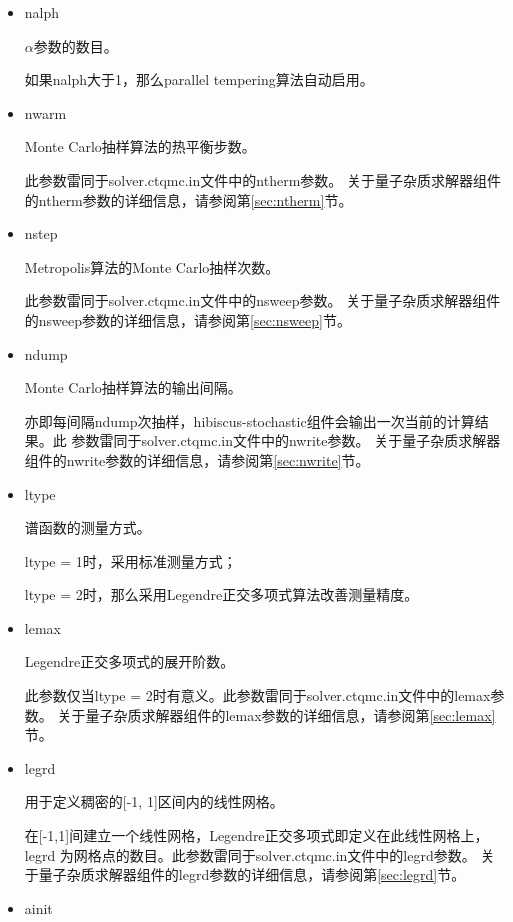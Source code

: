 \begin{itemize}
\item {\color{red}nalph}

$\alpha$参数的数目。

如果nalph大于1，那么parallel tempering算法自动启用。

\item {\color{red}nwarm}

Monte Carlo抽样算法的热平衡步数。

此参数雷同于solver.ctqmc.in文件中的ntherm参数。
关于量子杂质求解器组件的ntherm参数的详细信息，请参阅第\ref{sec:ntherm}节。

\item {\color{red}nstep}

Metropolis算法的Monte Carlo抽样次数。

此参数雷同于solver.ctqmc.in文件中的nsweep参数。
关于量子杂质求解器组件的nsweep参数的详细信息，请参阅第\ref{sec:nsweep}节。

\item {\color{red}ndump}

Monte Carlo抽样算法的输出间隔。

亦即每间隔ndump次抽样，hibiscus-stochastic组件会输出一次当前的计算结果。此
参数雷同于solver.ctqmc.in文件中的nwrite参数。
关于量子杂质求解器组件的nwrite参数的详细信息，请参阅第\ref{sec:nwrite}节。

\item {\color{red}ltype}

谱函数的测量方式。

ltype = 1时，采用标准测量方式；

ltype = 2时，那么采用Legendre正交多项式算法改善测量精度。

\item {\color{red}lemax}

Legendre正交多项式的展开阶数。

此参数仅当ltype = 2时有意义。此参数雷同于solver.ctqmc.in文件中的lemax参数。
关于量子杂质求解器组件的lemax参数的详细信息，请参阅第\ref{sec:lemax}节。

\item {\color{red}legrd}

用于定义稠密的[-1, 1]区间内的线性网格。

在[-1,1]间建立一个线性网格，Legendre正交多项式即定义在此线性网格上，legrd
为网格点的数目。此参数雷同于solver.ctqmc.in文件中的legrd参数。
关于量子杂质求解器组件的legrd参数的详细信息，请参阅第\ref{sec:legrd}节。

\item {\color{red}ainit}


\end{itemize}
